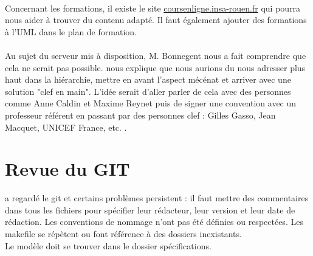\documentclass [a4paper] {article}
\begin{document}
\paragraph{}
Concernant les formations, il existe le site \url{coursenligne.insa-rouen.fr} qui pourra nous aider à trouver du contenu adapté. Il faut également ajouter des formations à l'UML dans le plan de formation.
\paragraph{}
Au sujet du serveur mis à disposition, M. Bonnegent nous a fait comprendre que cela ne serait pas possible. \nomTuteurPedago{} nous explique que nous aurions du nous adresser plus haut dans la hiérarchie, mettre en avant l'aspect mécénat et arriver avec une solution "clef en main". L'idée serait d'aller parler de cela avec des personnes comme Anne Caldin et Maxime Reynet puis de signer une convention avec un professeur référent en passant par des personnes clef : Gilles Gasso, Jean Macquet, UNICEF France, etc. .



\section{Revue du GIT}
\nomTuteurPedago{} a regardé le git et certains problèmes persistent : il faut mettre des commentaires dans tous les fichiers pour spécifier leur rédacteur, leur version et leur date de rédaction. Les conventions de nommage n'ont pas été définies ou respectées. Les makefile se répètent ou font référence à des dossiers inexistants.
\\
Le modèle \EACourt{} doit se trouver dans le dossier spécifications.




\newpage
\end{document}
